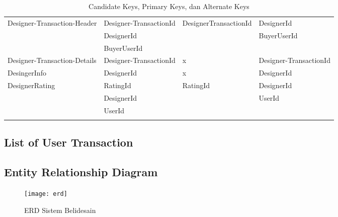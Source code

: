 \begin{longtable}{| p{3cm} | p{3.2cm} | l | p{3.2cm} |}
		Designer-Transaction-Header	& Designer-TransactionId	& DesignerTransactionId	& DesignerId			\\
									& DesignerId			& 						& BuyerUserId			\\
									& BuyerUserId			&						& 						\\ \hline
		Designer-Transaction-Details	& Designer-TransactionId	& x						& Designer-TransactionId	\\ \hline
		DesingerInfo				& DesignerId			& x						& DesignerId			\\ \hline
		DesignerRating				& RatingId				& RatingId				& DesignerId			\\
									& DesignerId			&						& UserId				\\
									& UserId				&						&						\\ \hline
									
		\caption{Candidate Keys, Primary Keys, dan Alternate Keys}
	\end{longtable}

\subsection{List of User Transaction}
\begin{center}
\end{center}

\subsection{Entity Relationship Diagram}
\begin{figure}[h]
	\centering
	\texttt{[image: erd]}
	\caption{ERD Sistem Belidesain}
\end{figure}

